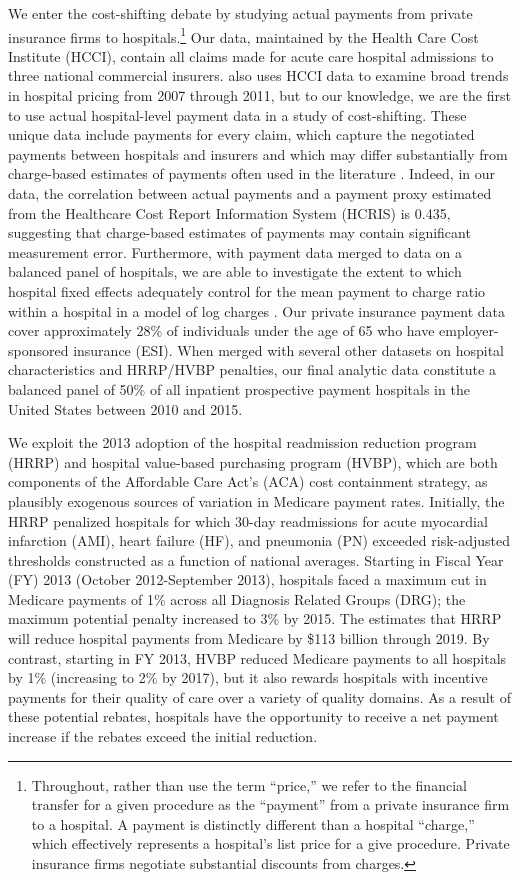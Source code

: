 \documentclass[12pt]{article}
\begin{document}
We enter the cost-shifting debate by studying actual payments from private insurance firms to hospitals.\footnote{Throughout, rather than use the term ``price,'' we refer to the financial transfer for a given procedure as the ``payment'' from a private insurance firm to a hospital.  A payment is distinctly different than a hospital ``charge,'' which effectively represents a hospital's list price for a give procedure. Private insurance firms negotiate substantial discounts from charges.}  Our data, maintained by the Health Care Cost Institute (HCCI), contain all claims made for acute care hospital admissions to three national commercial insurers. \cite{cooper2015} also uses HCCI data to examine broad trends in hospital pricing from 2007 through 2011, but to our knowledge, we are the first to use actual hospital-level payment data in a study of cost-shifting. These unique data include payments for every claim, which capture the negotiated payments between hospitals and insurers and which may differ substantially from charge-based estimates of payments often used in the literature \citep{dafny2009,dranove2017}. Indeed, in our data, the correlation between actual payments and a payment proxy estimated from the Healthcare Cost Report Information System (HCRIS) is 0.435, suggesting that charge-based estimates of payments may contain significant measurement error.  Furthermore, with payment data merged to data on a balanced panel of hospitals, we are able to investigate the extent to which hospital fixed effects adequately control for the mean payment to charge ratio within a hospital in a model of log charges \citep{cutler2000}. Our private insurance payment data cover approximately 28\% of individuals under the age of 65 who have employer-sponsored insurance (ESI). When merged with several other datasets on hospital characteristics and HRRP/HVBP penalties, our final analytic data constitute a balanced panel of 50\% of all inpatient prospective payment hospitals in the United States between 2010 and 2015.

We exploit the 2013 adoption of the hospital readmission reduction program (HRRP) and hospital value-based purchasing program (HVBP), which are both components of the Affordable Care Act's (ACA) cost containment strategy, as plausibly exogenous sources of variation in Medicare payment rates.  Initially, the HRRP penalized hospitals for which 30-day readmissions for acute myocardial infarction (AMI), heart failure (HF), and pneumonia (PN) exceeded risk-adjusted thresholds constructed as a function of national averages.  Starting in Fiscal Year (FY) 2013 (October 2012-September 2013), hospitals faced a maximum cut in Medicare payments of 1\% across all Diagnosis Related Groups (DRG); the maximum potential penalty increased to 3$\%$ by 2015.  The \cite{cbo2010} estimates that HRRP will reduce hospital payments from Medicare by \$113 billion through 2019.  By contrast, starting in FY 2013, HVBP reduced Medicare payments to all hospitals by 1\% (increasing to 2\% by 2017), but it also rewards hospitals with incentive payments for their quality of care over a variety of quality domains. As a result of these potential rebates, hospitals have the opportunity to receive a net payment increase if the rebates exceed the initial reduction.
\end{document}
